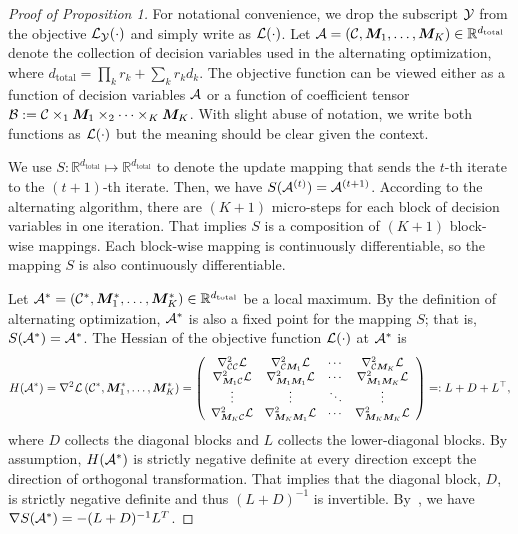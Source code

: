 \documentclass[11pt]{article}
\theoremstyle{plain}
\theoremstyle{definition}
\begin{document}
\begin{proof}[Proof of Proposition 1]
For notational convenience, we drop the subscript $\mathcal{Y}$ from the objective $\mathcal{L}_{\mathcal{Y}}(\cdot)$ and simply write as $\mathcal{L}(\cdot)$. Let $\mathcal{A} = (\mathcal{C}, \bm M_1,\ldots,\bm M_K) \in \mathbb{R}^{d_{\text{total}}}$ denote the collection of decision variables used in the alternating optimization, where $d_{\text{total}} = \prod_k r_k + \sum_k r_kd_k$. The objective function can be viewed either as a function of decision variables $\mathcal{A}$ or a function of coefficient tensor $\mathcal{B}:=\mathcal{C}\times_1\bm M_1\times_2\cdots \times_K\bm M_K$. With slight abuse of notation, we write both functions as $\mathcal{L}(\cdot)$ but the meaning should be clear given the context. 


We use $S\colon \mathbb{R}^{d_{\text{total}}} \mapsto  \mathbb{R}^{d_{\text{total}}} $ to denote the update mapping that sends the $t$-th iterate to the $(t+1)$-th iterate. Then, we have $S(\mathcal{A}^{(t)}) = \mathcal{A}^{(t+1)}$. According to the alternating algorithm, there are $(K+1)$ micro-steps for each block of decision variables in one iteration. That implies $S$ is a composition of $(K+1)$ block-wise mappings. Each block-wise mapping is continuously differentiable, so the mapping $S$ is also continuously differentiable. 

Let $\mathcal{A}^*=(\mathcal{C}^*, \bm M^*_1,\ldots,\bm M^*_K) \in \mathbb{R}^{d_{\text{total}}}$ be a local maximum. By the definition of alternating optimization, $\mathcal{A}^*$ is also a fixed point for the mapping $S$; that is, $S(\mathcal{A}^*)=\mathcal{A}^*$. The Hessian of the objective function $\mathcal{L}(\cdot)$ at $\mathcal{A}^*$ is
\begin{align*}
    H(\mathcal{A}^*) =  \nabla^2 \mathcal{L}\left(\mathcal{C}^*, \bm M_1^*,\ldots,\bm M_K^* \right) =\left(\begin{array}{cccc}\nabla_{\mathcal{C}\mathcal{C}}^{2} \mathcal{L} &\nabla_{\mathcal{C}\bm M_1}^{2} \mathcal{L}  & \cdots & \nabla_{\mathcal{C}\bm M_K}^{2} \mathcal{L} \\ \nabla_{\bm M_1\mathcal{C}}^{2} \mathcal{L}  &\nabla_{\bm M_1\bm M_1}^{2} \mathcal{L} & \cdots &  \nabla_{\bm M_1 \bm M_K}^{2} \mathcal{L}\\ \vdots & \vdots & \ddots & \vdots \\\nabla_{\bm M_K\mathcal{C}}^{2} \mathcal{L}& \nabla_{\bm M_K \bm M_1}^{2} \mathcal{L} & \cdots & \nabla_{\bm M_K \bm M_K}^{2} \mathcal{L} \end{array}\right)=:L+D+L^{\top},
\end{align*}
where $D$ collects the diagonal blocks and $L$ collects the lower-diagonal blocks. By assumption, $H(\mathcal{A}^*)$ is strictly negative definite at every direction except the direction of orthogonal transformation. That implies that the diagonal block, $D$, is strictly negative definite and thus $(L+ D)^{-1}$ is invertible. By~\citep[Lemma 2]{bezdek2003convergence}, we have $\nabla S(\mathcal{A}^*) = -(L+D)^{-1} L^T$.


\end{proof}
\end{document}
